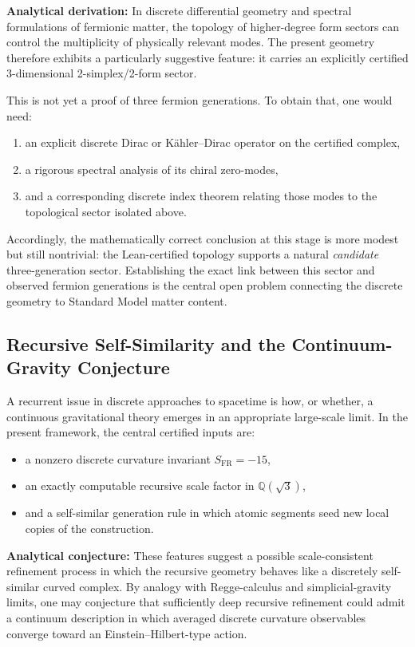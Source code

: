 \documentclass[12pt, a4paper]{article}
\begin{document}
\medskip

\noindent\textbf{Analytical derivation:} In discrete differential geometry and spectral formulations of fermionic matter, the topology of higher-degree form sectors can control the multiplicity of physically relevant modes. The present geometry therefore exhibits a particularly suggestive feature: it carries an explicitly certified 3-dimensional 2-simplex/2-form sector.

This is not yet a proof of three fermion generations. To obtain that, one would need:
\begin{enumerate}
    \item an explicit discrete Dirac or K\"ahler--Dirac operator on the certified complex,
    \item a rigorous spectral analysis of its chiral zero-modes,
    \item and a corresponding discrete index theorem relating those modes to the topological sector isolated above.
\end{enumerate}

Accordingly, the mathematically correct conclusion at this stage is more modest but still nontrivial: the Lean-certified topology supports a natural \emph{candidate} three-generation sector. Establishing the exact link between this sector and observed fermion generations is the central open problem connecting the discrete geometry to Standard Model matter content.

\subsection{Recursive Self-Similarity and the Continuum-Gravity Conjecture}

A recurrent issue in discrete approaches to spacetime is how, or whether, a continuous gravitational theory emerges in an appropriate large-scale limit. In the present framework, the central certified inputs are:
\begin{itemize}
    \item a nonzero discrete curvature invariant $S_{\mathrm{FR}} = -15$,
    \item an exactly computable recursive scale factor in $\mathbb{Q}(\sqrt{3})$,
    \item and a self-similar generation rule in which atomic segments seed new local copies of the construction.
\end{itemize}

\noindent\textbf{Analytical conjecture:} These features suggest a possible scale-consistent refinement process in which the recursive geometry behaves like a discretely self-similar curved complex. By analogy with Regge-calculus and simplicial-gravity limits, one may conjecture that sufficiently deep recursive refinement could admit a continuum description in which averaged discrete curvature observables converge toward an Einstein--Hilbert-type action.
\end{document}
